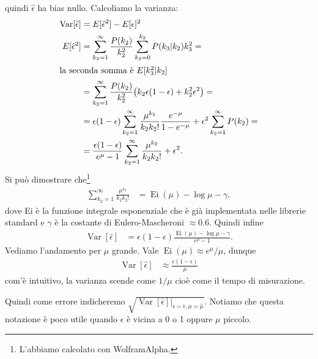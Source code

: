 quindi $\hat\epsilon$ ha bias nullo.
Calcoliamo la varianza:
\begin{align*}
	\operatorname{Var}[\hat\epsilon]
	&= E[\hat\epsilon^2] - E[\epsilon]^2 \\
	E[\hat\epsilon^2]
	&= \sum_{k_2=1}^\infty \frac{P(k_2)}{k_2^2}
	\sum_{k_3=0}^{k_2} P(k_3|k_2) k_3^2 = \\
	\intertext{la seconda somma è $E[k_3^2|k_2]$}
	&= \sum_{k_2=1}^\infty \frac{P(k_2)}{k_2^2}
	\big (k_2\epsilon(1-\epsilon) + k_2^2\epsilon^2 \big) = \\
	&= \epsilon(1-\epsilon) \sum_{k_2=1}^\infty \frac{\mu^{k_2}}{k_2k_2!}\frac{e^{-\mu}}{1-e^{-\mu}}
	+ \epsilon^2 \sum_{k_2=1}^\infty P(k_2) = \\
	&= \frac{\epsilon(1-\epsilon)}{e^{\mu}-1} \sum_{k_2=1}^\infty \frac{\mu^{k_2}}{k_2k_2!} + \epsilon^2.
\end{align*}
Si può dimostrare che\footnote{L'abbiamo calcolato con WolframAlpha.}
\begin{align*}
	\sum_{k_2=1}^\infty \frac{\mu^{k_2}}{k_2k_2!}
	&= \operatorname{Ei}(\mu) - \log\mu - \gamma,
\end{align*}
dove Ei è la funzione integrale esponenziale che è già implementata nelle librerie standard
e $\gamma$ è la costante di Eulero-Mascheroni $\approx 0.6$.
Quindi infine
\begin{align*}
	\operatorname{Var}[\hat\epsilon]
	&= \epsilon(1-\epsilon)\frac{\operatorname{Ei}(\mu) - \log\mu - \gamma}{e^\mu - 1}.
\end{align*}
Vediamo l'andamento per $\mu$ grande.
Vale $\operatorname{Ei}(\mu) \approx e^{\mu}/\mu$, dunque
\begin{align*}
	\operatorname{Var}[\hat\epsilon]
	&\approx \frac{\epsilon(1-\epsilon)}{\mu}
\end{align*}
com'è intuitivo, la varianza scende come $1/\mu$ cioè come il tempo di misurazione.

Quindi come errore indicheremo $\sqrt{\operatorname{Var}[\hat\epsilon]\big|_{\epsilon=\hat\epsilon,\mu=\hat\mu}}$.
Notiamo che questa notazione è poco utile quando $\epsilon$ è vicina a 0 o 1 oppure $\mu$ piccolo.